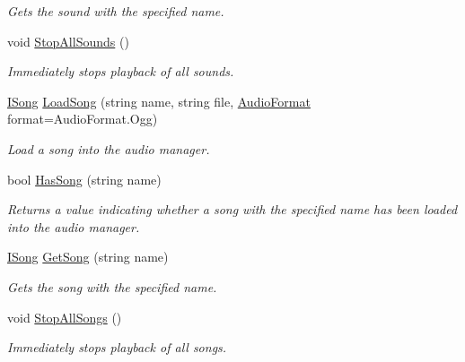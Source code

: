 \begin{DoxyCompactItemize}
\begin{DoxyCompactList}\small\item\em Gets the sound with the specified name. \end{DoxyCompactList}\item 
void \hyperlink{class_tri_devs_1_1_tri_engine2_d_1_1_audio_1_1_audio_manager_a6577eb88aa3abca4fd95ac8bbb84cd77}{Stop\-All\-Sounds} ()
\begin{DoxyCompactList}\small\item\em Immediately stops playback of all sounds. \end{DoxyCompactList}\item 
\hyperlink{interface_tri_devs_1_1_tri_engine2_d_1_1_audio_1_1_i_song}{I\-Song} \hyperlink{class_tri_devs_1_1_tri_engine2_d_1_1_audio_1_1_audio_manager_a0ae95f10c44e14894d38f8259a086ccf}{Load\-Song} (string name, string file, \hyperlink{namespace_tri_devs_1_1_tri_engine2_d_1_1_audio_ae238794863562d9b6204219dd29019ff}{Audio\-Format} format=Audio\-Format.\-Ogg)
\begin{DoxyCompactList}\small\item\em Load a song into the audio manager. \end{DoxyCompactList}\item 
bool \hyperlink{class_tri_devs_1_1_tri_engine2_d_1_1_audio_1_1_audio_manager_a1b1e301ae1c225cf5aad35e2541290b0}{Has\-Song} (string name)
\begin{DoxyCompactList}\small\item\em Returns a value indicating whether a song with the specified name has been loaded into the audio manager. \end{DoxyCompactList}\item 
\hyperlink{interface_tri_devs_1_1_tri_engine2_d_1_1_audio_1_1_i_song}{I\-Song} \hyperlink{class_tri_devs_1_1_tri_engine2_d_1_1_audio_1_1_audio_manager_af8304ed4b36c3a91d3cd58186cb4a449}{Get\-Song} (string name)
\begin{DoxyCompactList}\small\item\em Gets the song with the specified name. \end{DoxyCompactList}\item 
void \hyperlink{class_tri_devs_1_1_tri_engine2_d_1_1_audio_1_1_audio_manager_ab1a0a036e28dd1a5f4a02a9a4d7d9401}{Stop\-All\-Songs} ()
\begin{DoxyCompactList}\small\item\em Immediately stops playback of all songs. \end{DoxyCompactList}\end{DoxyCompactItemize}


